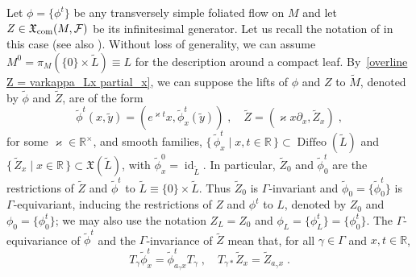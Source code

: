 \documentclass{memo-l}
\theoremstyle{plain}
\theoremstyle{definition}
\theoremstyle{remark}
\newcommand{\R}{\mathbb{R}}
\newcommand{\FF}{\mathcal{F}}
\newcommand{\fX}{\mathfrak{X}}
\newcommand{\id}{\operatorname{id}}
\newcommand{\Diffeo}{\operatorname{Diffeo}}
\newcommand{\fXcom}{\fX_{\text{\rm com}}}
\numberwithin{section}{chapter}
\numberwithin{equation}{section}%
\begin{document}
Let $\phi=\{\phi^t\}$ be any transversely simple foliated flow on $M$ and let $Z\in\fXcom(M,\FF)$ be its infinitesimal generator. Let us recall the notation of  in this case (see also ). Without loss of generality, we can assume $M^0=\pi_M(\{0\}\times\widetilde L)\equiv L$ for the description around a compact leaf. By~\eqref{overline Z = varkappa_Lx partial_x}, we can suppose the lifts of $\phi$ and $Z$ to $\widetilde M$, denoted by $\tilde\phi$ and $\widetilde Z$, are of the form
\begin{equation}\label{tilde phi^t(tilde y x) widetilde Z}
\tilde\phi^t(x,\tilde y)=(e^{\varkappa t}x,\tilde\phi_x^t(\tilde y))\;,\quad\widetilde Z=(\varkappa x\partial_x,\widetilde Z_x)\;,
\end{equation}
for some $\varkappa\in\R^\times$, and smooth families, $\{\,\widetilde\phi^t_x\mid x,t\in\R\,\}\subset\Diffeo(\widetilde L)$ and $\{\,\widetilde Z_x\mid x\in\R\,\}\subset\fX(\widetilde L)$, with $\tilde\phi_x^0=\id_{\widetilde L}$. In particular, $\widetilde Z_0$ and $\tilde\phi_0^t$ are the restrictions of $\widetilde Z$ and $\tilde\phi^t$ to $\widetilde L\equiv\{0\}\times\widetilde L$. Thus $\widetilde Z_0$ is $\Gamma$-invariant and $\tilde\phi_0=\{\tilde\phi_0^t\}$ is $\Gamma$-equivariant, inducing the restrictions of $Z$ and $\phi^t$ to $L$, denoted by $Z_0$ and $\phi_0=\{\phi_0^t\}$; we may also use the notation $Z_L=Z_0$ and $\phi_L=\{\phi_L^t\}=\{\phi_0^t\}$. The $\Gamma$-equivariance of $\tilde\phi^t$ and the $\Gamma$-invariance of $\widetilde Z$ mean that, for all $\gamma\in\Gamma$ and $x,t\in\R$,
\begin{equation}\label{T_gamma tilde phi_x^t = tilde phi_a_gamma x^t T_gamma}
T_\gamma\tilde\phi_x^t=\tilde\phi_{a_\gamma x}^tT_\gamma\;,\quad T_{\gamma*}\widetilde Z_x=\widetilde Z_{a_\gamma x}\;.
\end{equation}
\end{document}
